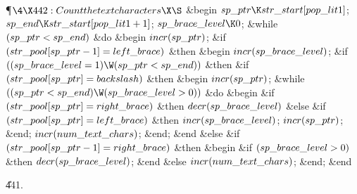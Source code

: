 \Y\P$\4\X442:Count the text characters\X\S$\6
\&{begin} $\\{sp\_ptr}\K\\{str\_start}[\\{pop\_lit1}]$;\5
$\\{sp\_end}\K\\{str\_start}[\\{pop\_lit1}+1]$;\5
$\\{sp\_brace\_level}\K0$;\6
\&{while} $(\\{sp\_ptr}<\\{sp\_end})$ \1\&{do}\6
\&{begin} $\\{incr}(\\{sp\_ptr})$;\6
\&{if} $(\\{str\_pool}[\\{sp\_ptr}-1]=\\{left\_brace})$ \1\&{then}\6
\&{begin} $\\{incr}(\\{sp\_brace\_level})$;\6
\&{if} $((\\{sp\_brace\_level}=1)\W(\\{sp\_ptr}<\\{sp\_end}))$ \1\&{then}\6
\&{if} $(\\{str\_pool}[\\{sp\_ptr}]=\\{backslash})$ \1\&{then}\6
\&{begin} $\\{incr}(\\{sp\_ptr})$;\6
\&{while} $((\\{sp\_ptr}<\\{sp\_end})\W(\\{sp\_brace\_level}>0))$ \1\&{do}\6
\&{begin} \&{if} $(\\{str\_pool}[\\{sp\_ptr}]=\\{right\_brace})$ \1\&{then}\5
$\\{decr}(\\{sp\_brace\_level})$\6
\4\&{else} \&{if} $(\\{str\_pool}[\\{sp\_ptr}]=\\{left\_brace})$ \1\&{then}\5
$\\{incr}(\\{sp\_brace\_level})$;\2\2\6
$\\{incr}(\\{sp\_ptr})$;\6
\&{end};\2\6
$\\{incr}(\\{num\_text\_chars})$;\6
\&{end};\2\2\6
\&{end}\6
\4\&{else} \&{if} $(\\{str\_pool}[\\{sp\_ptr}-1]=\\{right\_brace})$ \1\&{then}\6
\&{begin} \&{if} $(\\{sp\_brace\_level}>0)$ \1\&{then}\5
$\\{decr}(\\{sp\_brace\_level})$;\2\6
\&{end}\6
\4\&{else} $\\{incr}(\\{num\_text\_chars})$;\2\2\6
\&{end};\2\6
\&{end}\par
\U441.\fi

